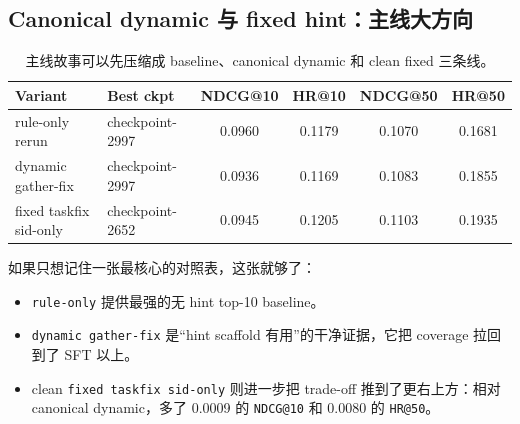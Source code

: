 \subsection{Canonical dynamic 与 fixed hint：主线大方向}

\begin{table}[H]
\centering
\small
\setlength{\tabcolsep}{4pt}
\begin{tabular}{p{3.8cm} p{2.6cm} c c c c}
\toprule
Variant & Best ckpt & NDCG@10 & HR@10 & NDCG@50 & HR@50 \\
\midrule
rule-only rerun & checkpoint-2997 & 0.0960 & 0.1179 & 0.1070 & 0.1681 \\
dynamic gather-fix & checkpoint-2997 & 0.0936 & 0.1169 & 0.1083 & 0.1855 \\
fixed taskfix sid-only & checkpoint-2652 & 0.0945 & 0.1205 & 0.1103 & 0.1935 \\
\bottomrule
\end{tabular}
\caption{主线故事可以先压缩成 baseline、canonical dynamic 和 clean fixed 三条线。}
\end{table}

如果只想记住一张最核心的对照表，这张就够了：

\begin{itemize}
\item \texttt{rule-only} 提供最强的无 hint top-10 baseline。
\item \texttt{dynamic gather-fix} 是“hint scaffold 有用”的干净证据，它把 coverage 拉回到了 SFT 以上。
\item clean \texttt{fixed taskfix sid-only} 则进一步把 trade-off 推到了更右上方：相对 canonical dynamic，多了 0.0009 的 \texttt{NDCG@10} 和 0.0080 的 \texttt{HR@50}。
\end{itemize}
